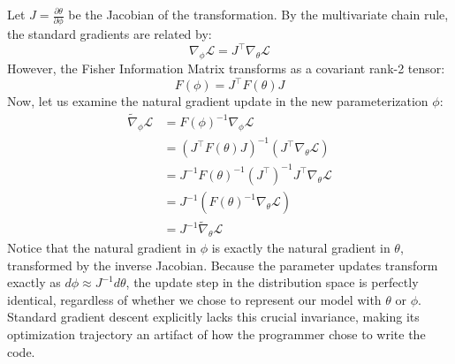 Let $J = \frac{\partial \theta}{\partial \phi}$ be the Jacobian of the transformation. By the multivariate chain rule, the standard gradients are related by:
\begin{equation}
    \nabla_\phi \mathcal{L} = J^\top \nabla_\theta \mathcal{L}
\end{equation}
However, the Fisher Information Matrix transforms as a covariant rank-2 tensor:
\begin{equation}
    F(\phi) = J^\top F(\theta) J
\end{equation}
Now, let us examine the natural gradient update in the new parameterization $\phi$:
\begin{align}
    \tilde{\nabla}_\phi \mathcal{L} &= F(\phi)^{-1} \nabla_\phi \mathcal{L} \nonumber \\
    &= (J^\top F(\theta) J)^{-1} (J^\top \nabla_\theta \mathcal{L}) \nonumber \\
    &= J^{-1} F(\theta)^{-1} (J^\top)^{-1} J^\top \nabla_\theta \mathcal{L} \nonumber \\
    &= J^{-1} (F(\theta)^{-1} \nabla_\theta \mathcal{L}) \nonumber \\
    &= J^{-1} \tilde{\nabla}_\theta \mathcal{L}
\end{align}
Notice that the natural gradient in $\phi$ is exactly the natural gradient in $\theta$, transformed by the inverse Jacobian. Because the parameter updates transform exactly as $d\phi \approx J^{-1} d\theta$, the update step in the distribution space is perfectly identical, regardless of whether we chose to represent our model with $\theta$ or $\phi$. Standard gradient descent explicitly lacks this crucial invariance, making its optimization trajectory an artifact of how the programmer chose to write the code.

